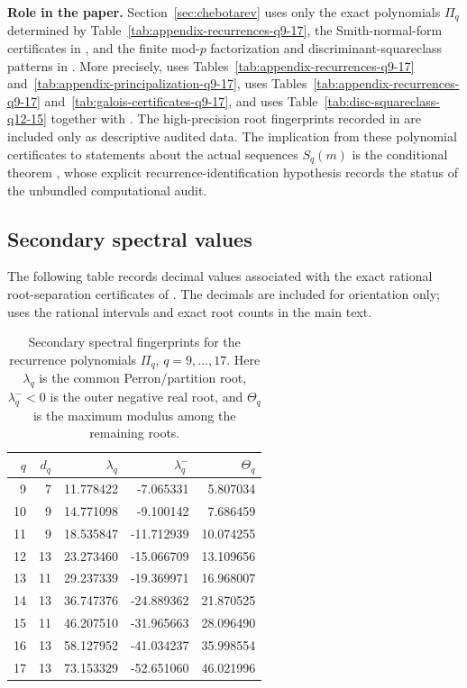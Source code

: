 \medskip
\noindent\textbf{Role in the paper.}
Section~\ref{sec:chebotarev} uses only the exact polynomials \(\Pi_q\)
determined by Table~\ref{tab:appendix-recurrences-q9-17}, the
Smith-normal-form certificates in
, and the finite mod-\(p\)
factorization and discriminant-squareclass patterns in
.  More
precisely,  uses
Tables~\ref{tab:appendix-recurrences-q9-17}
and~\ref{tab:appendix-principalization-q9-17},
 uses
Tables~\ref{tab:appendix-recurrences-q9-17}
and~\ref{tab:galois-certificates-q9-17}, and
 uses
Table~\ref{tab:disc-squareclass-q12-15} together with
.  The high-precision root fingerprints recorded in
 are included only as descriptive audited
data.  The implication from these polynomial certificates to statements about
the actual sequences $S_q(m)$ is the conditional theorem
, whose explicit recurrence-identification
hypothesis records the status of the unbundled computational audit.

\subsection{Secondary spectral values}

The following table records decimal values associated with the exact rational
root-separation certificates of
.  The decimals are included for
orientation only;  uses the rational
intervals and exact root counts in the main text.

\begin{table}[t]
\centering
\scriptsize
\setlength{\tabcolsep}{5pt}
\caption{Secondary spectral fingerprints for the recurrence polynomials
\(\Pi_q\), \(q=9,\dots,17\).  Here \(\lambda_q\) is the common
Perron/partition root, \(\lambda_q^-<0\) is the outer negative real root, and
\(\Theta_q\) is the maximum modulus among the remaining roots.}
\label{tab:secondary-spectral-q9-17}
\begin{tabular}{r r r r r}
\toprule
\(q\) & \(d_q\) & \(\lambda_q\) & \(\lambda_q^-\) & \(\Theta_q\) \\
\midrule
9  & 7  & 11.778422 & -7.065331  & 5.807034 \\
10 & 9  & 14.771098 & -9.100142  & 7.686459 \\
11 & 9  & 18.535847 & -11.712939 & 10.074255 \\
12 & 13 & 23.273460 & -15.066709 & 13.109656 \\
13 & 11 & 29.237339 & -19.369971 & 16.968007 \\
14 & 13 & 36.747376 & -24.889362 & 21.870525 \\
15 & 11 & 46.207510 & -31.965663 & 28.096490 \\
16 & 13 & 58.127952 & -41.034237 & 35.998554 \\
17 & 13 & 73.153329 & -52.651060 & 46.021996 \\
\bottomrule
\end{tabular}
\end{table}

